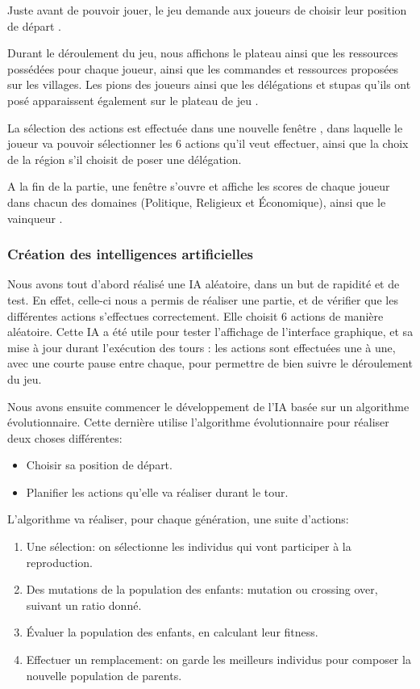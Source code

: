 		Juste avant de pouvoir jouer, le jeu demande aux joueurs de choisir leur position de départ .
		
		Durant le déroulement du jeu, nous affichons le plateau ainsi que les ressources
		possédées pour chaque joueur, ainsi que les commandes et ressources proposées sur
		les villages. Les pions des joueurs ainsi que les délégations et stupas qu'ils ont posé
		apparaissent également sur le plateau de jeu .
		
		La sélection des actions est effectuée dans une nouvelle fenêtre , dans laquelle
		le joueur va pouvoir sélectionner les 6 actions qu'il veut effectuer, ainsi que
		la choix de la région s'il choisit de poser une délégation.
		
		A la fin de la partie, une fenêtre s'ouvre et affiche les scores de chaque joueur
		dans chacun des domaines (Politique, Religieux et Économique), ainsi que le vainqueur .
			
	\subsubsection{Création des intelligences artificielles}
	
		Nous avons tout d'abord réalisé une IA aléatoire, dans un but de rapidité et de test.
		En effet, celle-ci nous a permis de réaliser une partie, et de vérifier que les différentes actions 
		s'effectues correctement. Elle choisit 6 actions de manière aléatoire.
		Cette IA a été utile pour tester l'affichage de l'interface graphique, et sa
		mise à jour durant l'exécution des tours : les actions sont effectuées une
		à une, avec une courte pause entre chaque, pour permettre de bien suivre le déroulement du jeu.
		
		Nous avons ensuite commencer le développement de l'IA basée sur un algorithme évolutionnaire.
		Cette dernière utilise l'algorithme évolutionnaire pour réaliser deux choses différentes:
		\begin{itemize}
			\item Choisir sa position de départ.
			\item Planifier les actions qu'elle va réaliser durant le tour.
		\end{itemize}
		
		L'algorithme va réaliser, pour chaque génération, une suite d'actions:
		\begin{enumerate}
			\item Une sélection: on sélectionne les individus qui vont participer à la reproduction.
			\item Des mutations de la population des enfants: mutation ou crossing over, suivant un ratio donné.
			\item Évaluer la population des enfants, en calculant leur fitness.
			\item Effectuer un remplacement: on garde les meilleurs individus pour composer la nouvelle population de parents.
		\end{enumerate}
		
		